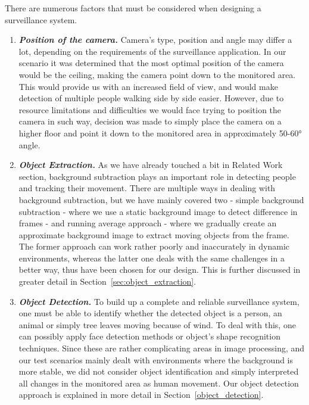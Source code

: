 There are numerous factors that must be considered when designing a surveillance system.
\begin{enumerate}
\item \textit{\textbf{Position of the camera.}} Camera's type, position and angle may differ a lot, depending on the requirements of the surveillance application. In our scenario it was determined that the most optimal position of the camera would be the ceiling, making the camera point down to the monitored area. This would provide us with an increased field of view, and would make detection of multiple people walking side by side easier. However, due to resource limitations and difficulties we would face trying to position the camera in such way, decision was made to simply place the camera on a higher floor and point it down to the monitored area in approximately 50-60\si{\degree} angle.

\item \textit{\textbf{Object Extraction.}} As we have already touched a bit in Related Work section, background subtraction plays an important role in detecting people and tracking their movement. There are multiple ways in dealing with background subtraction, but we have mainly covered two - simple background subtraction - where we use a static background image to detect difference in frames - and running average approach - where we gradually create an approximate background image to extract moving objects from the frame. The former approach can work rather poorly and inaccurately in dynamic environments, whereas the latter one deals with the same challenges in a better way, thus have been chosen for our design. This is further discussed in greater detail in Section~\ref{sec:object_extraction}.

\item \textit{\textbf{Object Detection.}} To build up a complete and reliable surveillance system, one must be able to identify whether the detected object is a person, an animal or simply tree leaves moving because of wind. To deal with this, one can possibly apply face detection methods or object's shape recognition techniques. Since these are rather complicating areas in image processing, and our test scenarios mainly dealt with environments where the background is more stable, we did not consider object identification and simply interpreted all changes in the monitored area as human movement. Our object detection approach is explained in more detail in Section~\ref{object_detection}.


\end{enumerate}
